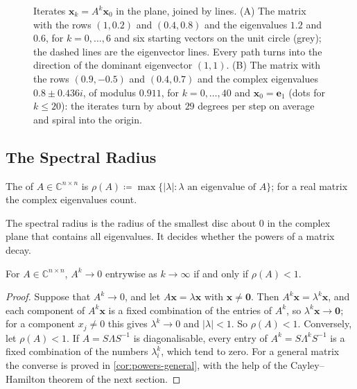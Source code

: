 \begin{figure}
{}
\caption{Iterates $\mathbf x_k=A^k\mathbf x_0$ in the plane, joined by lines. (A) The matrix with the rows $(1,0.2)$ and $(0.4,0.8)$ and the eigenvalues $1.2$ and $0.6$, for $k=0,\ldots,6$ and six starting vectors on the unit circle (grey); the dashed lines are the eigenvector lines. Every path turns into the direction of the dominant eigenvector $(1,1)$. (B) The matrix with the rows $(0.9,-0.5)$ and $(0.4,0.7)$ and the complex eigenvalues $0.8\pm0.436i$, of modulus $0.911$, for $k=0,\ldots,40$ and $\mathbf x_0=\mathbf e_1$ (dots for $k\le20$): the iterates turn by about $29$ degrees per step on average and spiral into the origin.\label{fig:powers-plane}}
\end{figure}

\subsection{The Spectral Radius}

\begin{definition}
\label{def:spectral-radius}
The  of $A\in\mathbb C^{n\times n}$ is $\rho(A)\coloneqq\max\{|\lambda|: \lambda\text{ an eigenvalue of }A\}$; for a real matrix the complex eigenvalues count.
\end{definition}

The spectral radius is the radius of the smallest disc about $0$ in the complex plane that contains all eigenvalues. It decides whether the powers of a matrix decay.

\begin{theorem}
\label{thm:powers-to-zero}
For $A\in\mathbb C^{n\times n}$, $A^k\to0$ entrywise as $k\to\infty$ if and only if $\rho(A)<1$.
\end{theorem}

\begin{proof}
Suppose that $A^k\to0$, and let $A\mathbf x=\lambda\mathbf x$ with $\mathbf x\ne\mathbf 0$. Then $A^k\mathbf x=\lambda^k\mathbf x$, and each component of $A^k\mathbf x$ is a fixed combination of the entries of $A^k$, so $\lambda^k\mathbf x\to\mathbf 0$; for a component $x_j\ne0$ this gives $\lambda^k\to0$ and $|\lambda|<1$. So $\rho(A)<1$. Conversely, let $\rho(A)<1$. If $A=S\Lambda S^{-1}$ is diagonalisable, every entry of $A^k=S\Lambda^kS^{-1}$ is a fixed combination of the numbers $\lambda_i^k$, which tend to zero. For a general matrix the converse is proved in \cref{cor:powers-general}, with the help of the Cayley--Hamilton theorem of the next section.
\end{proof}

